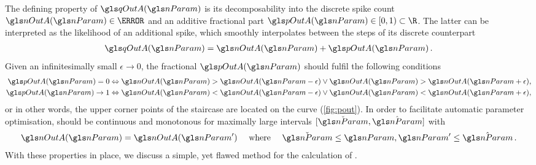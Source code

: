 The defining property of $\qOutA(\nParam)$ is its decomposability into the discrete spike count $\nOutA(\nParam) \in \N$ and an additive fractional part $\pOutA(\nParam) \in [0, 1)\subset \R$. The latter can be interpreted as the likelihood of an additional spike, which smoothly interpolates between the steps of its discrete counterpart
\begin{align}
	\qOutA(\nParam) = \nOutA(\nParam) + \pOutA(\nParam) \,.
	\label{eqn:fsc_decomposition}
\end{align}
Given an infinitesimally small $\epsilon \to 0$, the fractional $\pOutA(\nParam)$ should fulfil the following conditions
\begin{align}
	\pOutA(\nParam) = 0 &\Leftrightarrow \nOutA(\nParam) > \nOutA(\nParam - \epsilon) \vee \nOutA(\nParam) > \nOutA(\nParam + \epsilon) ,
	\label{eqn:fsc_zero}\\
	\pOutA(\nParam) \to 1 &\Leftrightarrow \nOutA(\nParam) < \nOutA(\nParam - \epsilon) \vee \nOutA(\nParam) < \nOutA(\nParam + \epsilon) ,
	\label{eqn:fsc_one}
\end{align}
or in other words, the upper corner points of the staircase \nOutA are located on the curve \pOutA (\cref{fig:pout}). In order to facilitate automatic parameter optimisation, \pOutA should be continuous and monotonous for maximally large intervals $[\check{\nParam}, \hat{\nParam}]$ with
\begin{align}
	\nOutA(\nParam) = \nOutA(\nParam') \quad \text{ where } \quad \check{\nParam} \leq \nParam, \nParam' \leq \hat{\nParam} \,.
	\label{eqn:fsc_interval}
\end{align}
With these properties in place, we discuss a simple, yet flawed method for the calculation of \pOutA.


